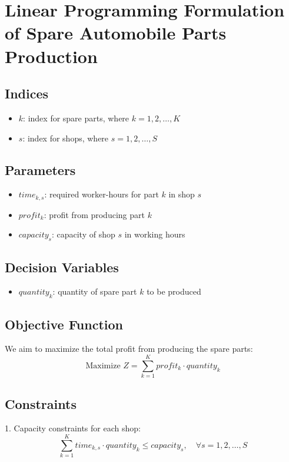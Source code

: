 \documentclass{article}
\begin{document}
\section*{Linear Programming Formulation of Spare Automobile Parts Production}

\subsection*{Indices}
\begin{itemize}
    \item $k$: index for spare parts, where $k = 1, 2, \ldots, K$
    \item $s$: index for shops, where $s = 1, 2, \ldots, S$
\end{itemize}

\subsection*{Parameters}
\begin{itemize}
    \item $time_{k, s}$: required worker-hours for part $k$ in shop $s$
    \item $profit_{k}$: profit from producing part $k$
    \item $capacity_{s}$: capacity of shop $s$ in working hours
\end{itemize}

\subsection*{Decision Variables}
\begin{itemize}
    \item $quantity_{k}$: quantity of spare part $k$ to be produced
\end{itemize}

\subsection*{Objective Function}
We aim to maximize the total profit from producing the spare parts:
\[
\text{Maximize } Z = \sum_{k=1}^{K} profit_{k} \cdot quantity_{k}
\]

\subsection*{Constraints}
1. Capacity constraints for each shop:
\[
\sum_{k=1}^{K} time_{k, s} \cdot quantity_{k} \leq capacity_{s}, \quad \forall s = 1, 2, \ldots, S
\]
\end{document}
